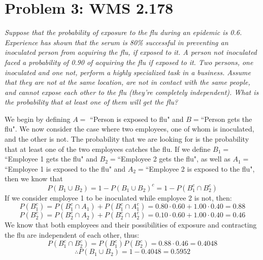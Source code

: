 \documentclass{article}
\begin{document}
	\pagebreak
	
	\section*{Problem 3: WMS 2.178}
		\emph{Suppose that the probability of exposure to the flu during an epidemic is 0.6. Experience has shown that the serum is 80\% successful in preventing an inoculated person from acquiring the flu, if exposed to it. A person not inoculated faced a probability of 0.90 of acquiring the flu if exposed to it. Two persons, one inoculated and one not, perform a highly specialized task in a business. Assume that they are not at the same location, are not in contact with the same people, and cannot expose each other to the flu (they're completely independent). What is the probability that at least one of them will get the flu?}
		
	\begin{sol}
		We begin by defining $A = $ ``Person is exposed to flu" and $B=$``Person gets the flu". We now consider the case where two employees, one of whom is inoculated, and the other is not. The probability that we are looking for is the probability that at least one of the two employees catches the flu. If we define $B_1= $``Employee 1 gets the flu" and $B_2=$``Employee 2 gets the flu", as well as $A_1=$``Employee 1 is exposed to the flu" and $A_2 =$``Employee 2 is exposed to the flu", then we know that
		$$ P (B_1 \cup B_2) = 1 - P (B_1 \cup B_2)^c = 1 - P(B_1^c \cap B_2^c)$$
		If we consider employee 1 to be inoculated while employee 2 is not, then:
		$$ P(B_1^c)= P (B_1^c \cap A_1) + P (B_1^c \cap A_1^c) = 0.80 \cdot 0.60 + 1.00 \cdot 0.40 = 0.88 $$
		$$ P(B_2^c) = P(B_2^c \cap A_2) + P(B_2^c \cap A_2^c) = 0.10 \cdot 0.60 + 1.00 \cdot 0.40 = 0.46 $$
		We know that both employees and their possibilities of exposure and contracting the flu are independent of each other, thus:
		$$ P (B_1^c \cap B_2^c) = P (B_1^c) P(B_2^c) = 0.88 \cdot 0.46 = 0.4048$$
		$$ \therefore P(B_1 \cup B_2) = 1 - 0.4048 = 0.5952$$
		
	\end{sol}
\pagebreak
\end{document}
